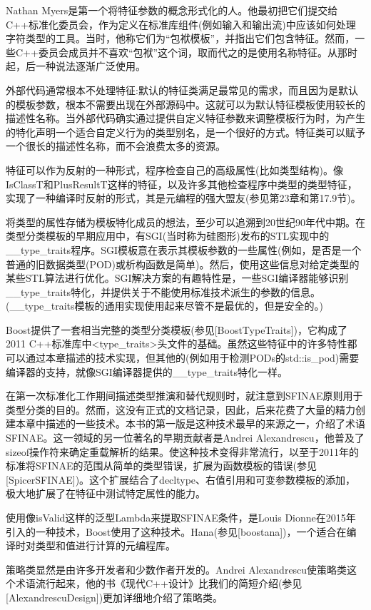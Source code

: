 Nathan Myers是第一个将特征参数的概念形式化的人。他最初把它们提交给C++标准化委员会，作为定义在标准库组件(例如输入和输出流)中应该如何处理字符类型的工具。当时，他称它们为“包袱模板”，并指出它们包含特征。然而，一些C++委员会成员并不喜欢“包袱”这个词，取而代之的是使用名称特征。从那时起，后一种说法逐渐广泛使用。

外部代码通常根本不处理特征:默认的特征类满足最常见的需求，而且因为是默认的模板参数，根本不需要出现在外部源码中。这就可以为默认特征模板使用较长的描述性名称。当外部代码确实通过提供自定义特征参数来调整模板行为时，为产生的特化声明一个适合自定义行为的类型别名，是一个很好的方式。特征类可以赋予一个很长的描述性名称，而不会浪费太多的资源。

特征可以作为反射的一种形式，程序检查自己的高级属性(比如类型结构)。像IsClassT和PlusResultT这样的特征，以及许多其他检查程序中类型的类型特征，实现了一种编译时反射的形式，其是元编程的强大盟友(参见第23章和第17.9节)。

将类型的属性存储为模板特化成员的想法，至少可以追溯到20世纪90年代中期。在类型分类模板的早期应用中，有SGI(当时称为硅图形)发布的STL实现中的\_\_type\_traits程序。SGI模板意在表示其模板参数的一些属性(例如，是否是一个普通的旧数据类型(POD)或析构函数是简单)。然后，使用这些信息对给定类型的某些STL算法进行优化。SGI解决方案的有趣特性是，一些SGI编译器能够识别\_\_type\_traits特化，并提供关于不能使用标准技术派生的参数的信息。(\_\_type\_traits模板的通用实现使用起来尽管不是最优的，但是安全的。)

Boost提供了一套相当完整的类型分类模板(参见[BoostTypeTraits])，它构成了2011 C++标准库中<type\_traits>头文件的基础。虽然这些特征中的许多特性都可以通过本章描述的技术实现，但其他的(例如用于检测PODs的std::is\_pod)需要编译器的支持，就像SGI编译器提供的\_\_type\_traits特化一样。

在第一次标准化工作期间描述类型推演和替代规则时，就注意到SFINAE原则用于类型分类的目的。然而，这没有正式的文档记录，因此，后来花费了大量的精力创建本章中描述的一些技术。本书的第一版是这种技术最早的来源之一，介绍了术语SFINAE。这一领域的另一位著名的早期贡献者是Andrei Alexandrescu，他普及了sizeof操作符来确定重载解析的结果。使这种技术变得非常流行，以至于2011年的标准将SFINAE的范围从简单的类型错误，扩展为函数模板的错误(参见[SpicerSFINAE])。这个扩展结合了decltype、右值引用和可变参数模板的添加，极大地扩展了在特征中测试特定属性的能力。

使用像isValid这样的泛型Lambda来提取SFINAE条件，是Louis Dionne在2015年引入的一种技术，Boost使用了这种技术。Hana(参见[boostana])，一个适合在编译时对类型和值进行计算的元编程库。

策略类显然是由许多开发者和少数作者开发的。Andrei Alexandrescu使策略类这个术语流行起来，他的书《现代C++设计》比我们的简短介绍(参见[AlexandrescuDesign])更加详细地介绍了策略类。